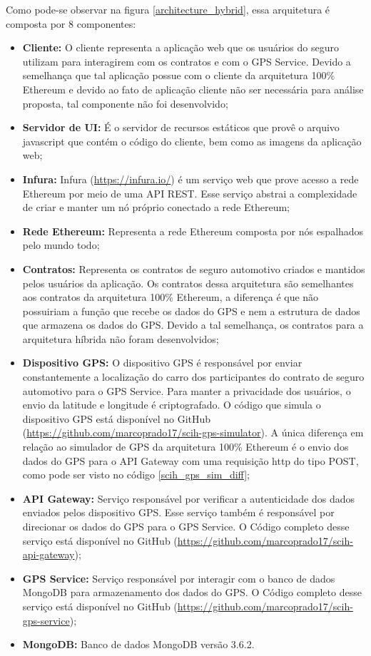 Como pode-se observar na figura \ref{architecture_hybrid}, essa arquitetura é composta por 8 componentes:

\begin{itemize}
	\item \textbf{Cliente:} O cliente representa a aplicação web que os usuários do seguro utilizam para interagirem com os contratos e com o GPS Service. Devido a semelhança que tal aplicação possue com o cliente da arquitetura 100\% Ethereum e devido ao fato de aplicação cliente não ser necessária para análise proposta, tal componente não foi desenvolvido;
    \item \textbf{Servidor de UI:} É o servidor de recursos estáticos que provê o arquivo javascript que contém o código do cliente, bem como as imagens da aplicação web;
    \item \textbf{Infura:} Infura (\href{https://infura.io/}{https://infura.io/}) é um serviço web que prove acesso a rede Ethereum por meio de uma API REST. Esse serviço abstrai a complexidade de criar e manter um nó próprio conectado a rede Ethereum;
    \item \textbf{Rede Ethereum:} Representa a rede Ethereum composta por nós espalhados pelo mundo todo;
    \item \textbf{Contratos:} Representa os contratos de seguro automotivo criados e mantidos pelos usuários da aplicação. Os contratos dessa arquitetura são semelhantes aos contratos da arquitetura 100\% Ethereum, a diferença é que não possuiriam a função que recebe os dados do GPS e nem a estrutura de dados que armazena os dados do GPS. Devido a tal semelhança, os contratos para a arquitetura híbrida não foram desenvolvidos;
    \item \textbf{Dispositivo GPS:} O dispositivo GPS é responsável por enviar constantemente a localização do carro dos participantes do contrato de seguro automotivo para o GPS Service. Para manter a privacidade dos usuários, o envio da latitude e longitude é criptografado. O código que simula o dispositivo GPS está disponível no GitHub (\href{https://github.com/marcoprado17/scih-gps-simulator}{https://github.com/marcoprado17/scih-gps-simulator}). A única diferença em relação ao simulador de GPS da arquitetura 100\% Ethereum é o envio dos dados do GPS para o API Gateway com uma requisição http do tipo POST, como pode ser visto no código \ref{scih_gps_sim_diff};
    \item \textbf{API Gateway:} Serviço responsável por verificar a autenticidade dos dados enviados pelos dispositivo GPS. Esse serviço também é responsável por direcionar os dados do GPS para o GPS Service. O Código completo desse serviço está disponível no GitHub (\href{https://github.com/marcoprado17/scih-api-gateway}{https://github.com/marcoprado17/scih-api-gateway});
    \item \textbf{GPS Service:} Serviço responsável por interagir com o banco de dados MongoDB para armazenamento dos dados do GPS. O Código completo desse serviço está disponível no GitHub (\href{https://github.com/marcoprado17/scih-gps-service}{https://github.com/marcoprado17/scih-gps-service});
    \item \textbf{MongoDB:} Banco de dados MongoDB versão 3.6.2.
\end{itemize}

